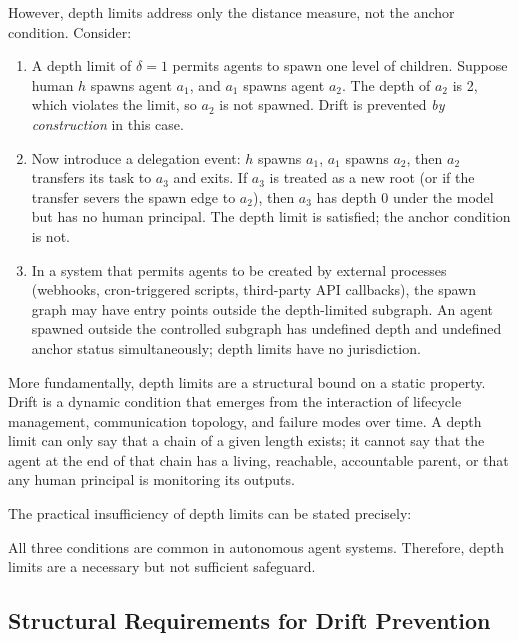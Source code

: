 However, depth limits address only the distance measure, not the anchor condition. Consider:

\begin{enumerate}
\item A depth limit of $\delta = 1$ permits agents to spawn one level of children. Suppose human $h$ spawns agent $a_1$, and $a_1$ spawns agent $a_2$. The depth of $a_2$ is 2, which violates the limit, so $a_2$ is not spawned. Drift is prevented \emph{by construction} in this case.

\item Now introduce a delegation event: $h$ spawns $a_1$, $a_1$ spawns $a_2$, then $a_2$ transfers its task to $a_3$ and exits. If $a_3$ is treated as a new root (or if the transfer severs the spawn edge to $a_2$), then $a_3$ has depth 0 under the model but has no human principal. The depth limit is satisfied; the anchor condition is not.

\item In a system that permits agents to be created by external processes (webhooks, cron-triggered scripts, third-party API callbacks), the spawn graph may have entry points outside the depth-limited subgraph. An agent spawned outside the controlled subgraph has undefined depth and undefined anchor status simultaneously; depth limits have no jurisdiction.
\end{enumerate}

More fundamentally, depth limits are a structural bound on a static property. Drift is a dynamic condition that emerges from the interaction of lifecycle management, communication topology, and failure modes over time. A depth limit can only say that a chain of a given length exists; it cannot say that the agent at the end of that chain has a living, reachable, accountable parent, or that any human principal is monitoring its outputs.

The practical insufficiency of depth limits can be stated precisely:

\begin{center}
\end{center}

All three conditions are common in autonomous agent systems. Therefore, depth limits are a necessary but not sufficient safeguard.

\subsection{Structural Requirements for Drift Prevention}

